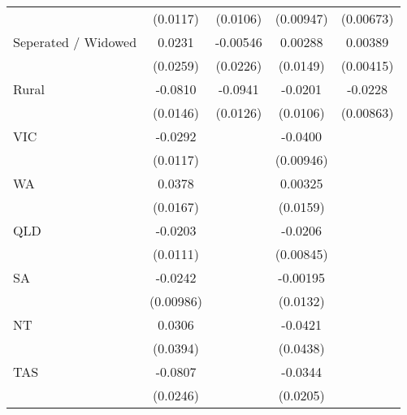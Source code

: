 {\begin{tabular}{l*{4}{c}}
                    &    (0.0117)         &    (0.0106)         &   (0.00947)         &   (0.00673)         \\
[1em]
Seperated / Widowed &      0.0231         &    -0.00546         &     0.00288         &     0.00389         \\
                    &    (0.0259)         &    (0.0226)         &    (0.0149)         &   (0.00415)         \\
[1em]
Rural               &     -0.0810\sym{***}&     -0.0941\sym{***}&     -0.0201         &     -0.0228\sym{**} \\
                    &    (0.0146)         &    (0.0126)         &    (0.0106)         &   (0.00863)         \\
[1em]
VIC                 &     -0.0292\sym{*}  &                     &     -0.0400\sym{***}&                     \\
                    &    (0.0117)         &                     &   (0.00946)         &                     \\
[1em]
WA                  &      0.0378\sym{*}  &                     &     0.00325         &                     \\
                    &    (0.0167)         &                     &    (0.0159)         &                     \\
[1em]
QLD                 &     -0.0203         &                     &     -0.0206\sym{*}  &                     \\
                    &    (0.0111)         &                     &   (0.00845)         &                     \\
[1em]
SA                  &     -0.0242\sym{*}  &                     &    -0.00195         &                     \\
                    &   (0.00986)         &                     &    (0.0132)         &                     \\
[1em]
NT                  &      0.0306         &                     &     -0.0421         &                     \\
                    &    (0.0394)         &                     &    (0.0438)         &                     \\
[1em]
TAS                 &     -0.0807\sym{**} &                     &     -0.0344         &                     \\
                    &    (0.0246)         &                     &    (0.0205)         &                     \\

\end{tabular}}
